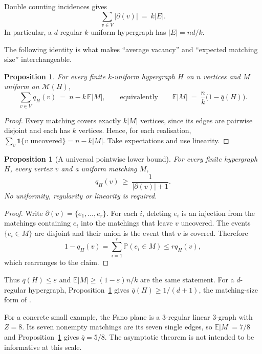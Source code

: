 \documentclass[10pt,a4paper]{amsart}
\newtheorem{proposition}[theorem]{Proposition}
\newcommand{\VV}{V}
\newcommand{\EE}{E}
\newcommand{\Mat}{\mathcal{M}}
\newcommand{\PP}{\mathbb{P}}
\newcommand{\EX}{\mathbb{E}}
\newcommand{\qbar}{\overline{q}}
\newcommand{\dg}{\partial}
\begin{document}
Double counting incidences gives
\begin{equation}
\label{eq:edgecount}
  \sum_{v\in\VV}|\dg(v)|\ =\ k|\EE|.
\end{equation}
In particular, a $d$-regular $k$-uniform hypergraph has $|\EE|=nd/k$.

The following identity is what makes ``average vacancy'' and ``expected matching size''
interchangeable.

\begin{proposition}
\label{prop:avgid}
For every finite $k$-uniform hypergraph $H$ on $n$ vertices and $M$ uniform on
$\Mat(H)$,
\[
  \sum_{v\in \VV} q_H(v)\ =\ n-k\,\EX|M|,
  \qquad\text{equivalently}\qquad
  \EX|M|\ =\ \frac{n}{k}\bigl(1-\qbar(H)\bigr).
\]
\end{proposition}

\begin{proof}
Every matching covers exactly $k|M|$ vertices, since its edges are pairwise disjoint and
each has $k$ vertices. Hence, for each realisation,
$\sum_{v}\mathbf{1}\{v\text{ uncovered}\}=n-k|M|$. Take expectations and use linearity.
\end{proof}

\begin{proposition}[A universal pointwise lower bound]
\label{prop:pointlower}
For every finite hypergraph $H$, every vertex $v$ and a uniform matching $M$,
\[
  q_H(v)\ \ge\ \frac1{|\dg(v)|+1}.
\]
No uniformity, regularity or linearity is required.
\end{proposition}

\begin{proof}
Write $\dg(v)=\{e_1,\ldots,e_r\}$. For each $i$, deleting $e_i$ is an injection from
the matchings containing $e_i$ into the matchings that leave $v$ uncovered. The events
$\{e_i\in M\}$ are disjoint and their union is the event that $v$ is covered. Therefore
\[
  1-q_H(v)=\sum_{i=1}^r\PP(e_i\in M)\le r q_H(v),
\]
which rearranges to the claim.
\end{proof}

Thus $\qbar(H)\le\varepsilon$ and $\EX|M|\ge(1-\varepsilon)n/k$ are the same statement.
For a $d$-regular hypergraph, Proposition~\ref{prop:pointlower} gives
$\qbar(H)\ge1/(d+1)$, the matching-size form of \cite[Corollary 5.1]{Lee}.

For a concrete small example, the Fano plane is a $3$-regular linear $3$-graph with
$Z=8$. Its seven nonempty matchings are its seven single edges, so
$\EX|M|=7/8$ and Proposition~\ref{prop:avgid} gives $\qbar=5/8$. The asymptotic theorem
is not intended to be informative at this scale.
\end{document}
